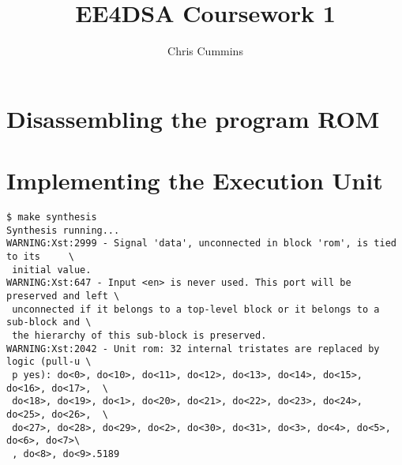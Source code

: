 \documentclass[12pt,a4paper]{article}
\title{EE4DSA Coursework 1}
\author{Chris Cummins}
\begin{document}
\maketitle

\section{Disassembling the program ROM}

\section{Implementing the Execution Unit}

\begin{verbatim}
$ make synthesis
Synthesis running...
WARNING:Xst:2999 - Signal 'data', unconnected in block 'rom', is tied to its     \
 initial value.
WARNING:Xst:647 - Input <en> is never used. This port will be preserved and left \
 unconnected if it belongs to a top-level block or it belongs to a sub-block and \
 the hierarchy of this sub-block is preserved.
WARNING:Xst:2042 - Unit rom: 32 internal tristates are replaced by logic (pull-u \
 p yes): do<0>, do<10>, do<11>, do<12>, do<13>, do<14>, do<15>, do<16>, do<17>,  \
 do<18>, do<19>, do<1>, do<20>, do<21>, do<22>, do<23>, do<24>, do<25>, do<26>,  \
 do<27>, do<28>, do<29>, do<2>, do<30>, do<31>, do<3>, do<4>, do<5>, do<6>, do<7>\
 , do<8>, do<9>.5189
\end{verbatim}
\end{document}
